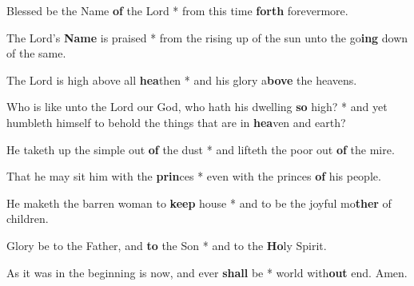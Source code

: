 \begin{multicols}{2}
	Blessed be the Name \textbf{of} the Lord * from this time \textbf{forth} forevermore.
	
	The Lord's \textbf{Name} is praised * from the rising up of the sun unto the go\textbf{ing} down of the same.
	
	The Lord is high above all \textbf{hea}then * and his glory a\textbf{bove} the heavens.
	
	Who is like unto the Lord our God, who hath his dwelling \textbf{so} high? * and yet humbleth himself to behold the things that are in \textbf{hea}ven and earth?
	
	He taketh up the simple out \textbf{of} the dust * and lifteth the poor out \textbf{of} the mire.
	
	That he may sit him with the \textbf{prin}ces * even with the princes \textbf{of} his people.
	
	He maketh the barren woman to \textbf{keep} house * and to be the joyful mo\textbf{ther} of children.
	
	Glory be to the Father, and \textbf{to} the Son * and to the \textbf{Ho}ly Spirit.
	
	As it was in the beginning is now, and ever \textbf{shall} be * world with\textbf{out} end. Amen.
\end{multicols}